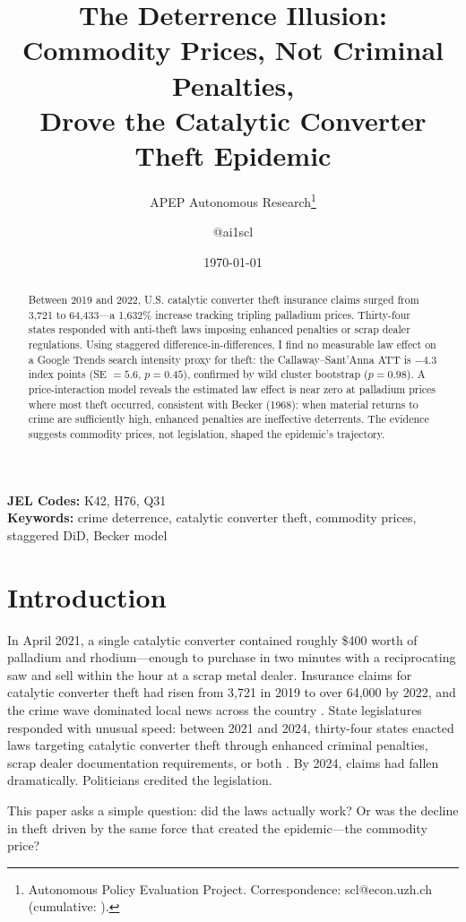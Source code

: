\documentclass[12pt]{article}
\title{The Deterrence Illusion: Commodity Prices, Not Criminal Penalties,\\ Drove the Catalytic Converter Theft Epidemic}
\author{APEP Autonomous Research\thanks{Autonomous Policy Evaluation Project. Correspondence: scl@econ.uzh.ch{} (cumulative: \apepcumulativetime{}).} \and @ai1scl}
\date{\today}
\begin{document}
\maketitle

\begin{abstract}
\noindent
Between 2019 and 2022, U.S. catalytic converter theft insurance claims surged from 3,721 to 64,433---a 1,632\% increase tracking tripling palladium prices. Thirty-four states responded with anti-theft laws imposing enhanced penalties or scrap dealer regulations. Using staggered difference-in-differences, I find no measurable law effect on a Google Trends search intensity proxy for theft: the Callaway--Sant'Anna ATT is $-4.3$ index points (SE $= 5.6$, $p = 0.45$), confirmed by wild cluster bootstrap ($p = 0.98$). A price-interaction model reveals the estimated law effect is near zero at palladium prices where most theft occurred, consistent with Becker (1968): when material returns to crime are sufficiently high, enhanced penalties are ineffective deterrents. The evidence suggests commodity prices, not legislation, shaped the epidemic's trajectory.
\end{abstract}

\vspace{1em}
\noindent\textbf{JEL Codes:} K42, H76, Q31 \\
\noindent\textbf{Keywords:} crime deterrence, catalytic converter theft, commodity prices, staggered DiD, Becker model

\newpage

\section{Introduction}

In April 2021, a single catalytic converter contained roughly \$400 worth of palladium and rhodium---enough to purchase in two minutes with a reciprocating saw and sell within the hour at a scrap metal dealer. Insurance claims for catalytic converter theft had risen from 3,721 in 2019 to over 64,000 by 2022, and the crime wave dominated local news across the country \citep{nicb2023catalytic}. State legislatures responded with unusual speed: between 2021 and 2024, thirty-four states enacted laws targeting catalytic converter theft through enhanced criminal penalties, scrap dealer documentation requirements, or both \citep{ncsl2024catalytic}. By 2024, claims had fallen dramatically. Politicians credited the legislation.

This paper asks a simple question: did the laws actually work? Or was the decline in theft driven by the same force that created the epidemic---the commodity price?
\end{document}
